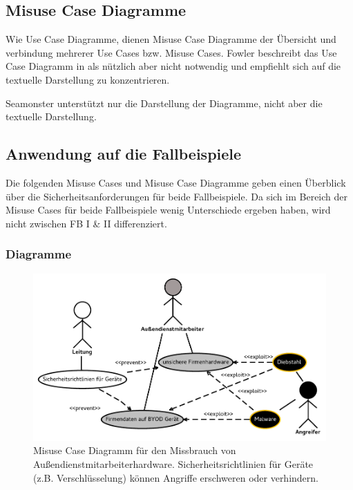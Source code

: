 \subsection{Misuse Case Diagramme}
Wie Use Case Diagramme, dienen Misuse Case Diagramme der Übersicht und verbindung mehrerer Use Cases bzw. Misuse Cases. Fowler beschreibt das Use Case Diagramm in \cite{fowler2004uml} als nützlich aber nicht notwendig und empfiehlt sich auf die textuelle Darstellung zu konzentrieren. 

Seamonster unterstützt nur die Darstellung der Diagramme, nicht aber die textuelle Darstellung.

\subsection{Anwendung auf die Fallbeispiele}
Die folgenden Misuse Cases und Misuse Case Diagramme geben einen Überblick über die Sicherheitsanforderungen für beide Fallbeispiele. Da sich im Bereich der Misuse Cases für beide Fallbeispiele wenig Unterschiede ergeben haben, wird nicht zwischen FB I \& II differenziert.

\subsubsection{Diagramme}

\begin{figure}[h]
\includegraphics[scale=0.8]{images/Hardware.pdf} 
\caption{Misuse Case Diagramm für den Missbrauch von Außendienstmitarbeiterhardware. Sicherheitsrichtlinien für Geräte (z.B. Verschlüsselung) können Angriffe erschweren oder verhindern.}
\end{figure}

